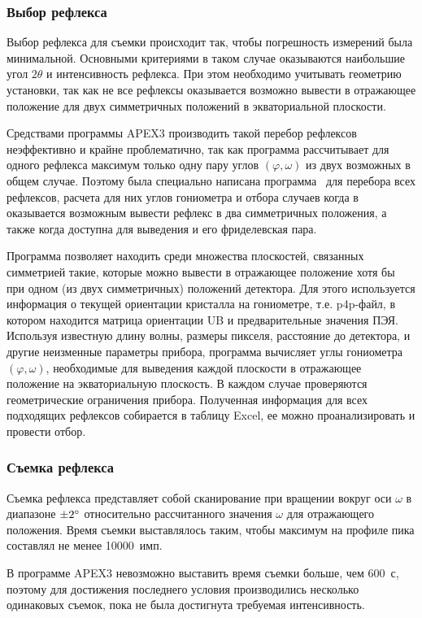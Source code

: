 \subsubsection{Выбор рефлекса}
Выбор рефлекса для съемки происходит так, чтобы погрешность измерений была минимальной.
Основными критериями в таком случае оказываются наибольшие угол $2\theta$ и интенсивность рефлекса.
При этом необходимо учитывать геометрию установки, так как не все рефлексы оказывается возможно вывести в отражающее положение для двух симметричных положений в экваториальной плоскости.

Средствами программы APEX3 производить такой перебор рефлексов неэффективно и крайне проблематично, так как программа рассчитывает для одного рефлекса максимум только одну пару углов $(\varphi, \omega)$ из двух возможных в общем случае.
Поэтому была специально написана программа~\cite{Kudryavtsev:2024:eccentr} для перебора всех рефлексов, расчета для них углов гониометра и отбора случаев когда в оказывается возможным вывести рефлекс в два симметричных положения, а также когда доступна для выведения и его фриделевская пара.

Программа позволяет находить среди множества плоскостей, связанных симметрией такие, которые можно вывести в отражающее положение хотя бы при одном (из двух симметричных) положений детектора.
Для этого используется информация о текущей ориентации кристалла на гониометре, т.е. p4p-файл, в котором находится матрица ориентации UB и предварительные значения ПЭЯ.
Используя известную длину волны, размеры пикселя, расстояние до детектора, и другие неизменные параметры прибора, программа вычисляет углы гониометра $(\varphi, \omega)$, необходимые для выведения каждой плоскости в отражающее положение на экваториальную плоскость.
В каждом случае проверяются геометрические ограничения прибора.
Полученная информация для всех подходящих рефлексов собирается в таблицу Excel, ее можно проанализировать и провести отбор.
\subsubsection{Съемка рефлекса}
Съемка рефлекса представляет собой сканирование при вращении вокруг оси $\omega$ в диапазоне $\pm 2^\circ$ относительно рассчитанного значения $\omega$ для отражающего положения.
Время съемки выставлялось таким, чтобы максимум на профиле пика составлял не менее 10000~имп.

В программе APEX3 невозможно выставить время съемки больше, чем 600~с, поэтому для достижения последнего условия производились несколько одинаковых съемок, пока не была достигнута требуемая интенсивность.
